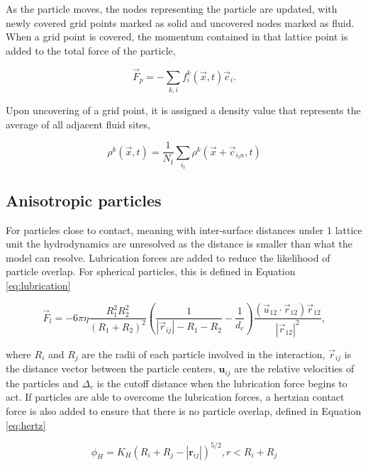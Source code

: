 As the particle moves, the nodes representing the particle are updated, with newly covered grid points marked as solid and 
uncovered nodes marked as fluid. When a grid point is covered, the momentum contained in that lattice point is added to the 
total force of the particle,

\begin{equation}
    \vec{F}_p = -\sum_{k,i} f_i^k(\vec{x},t)\vec{c}_i .
\end{equation}

Upon uncovering of a grid point, it is assigned a density value that represents the average of all adjacent fluid sites,

\begin{equation}
    \rho^k(\vec{x},t) = \frac{1}{N_{\text{f}}} \sum_{i_{\text{f}}} \rho^k(\vec{x}+\vec{c}_{i_{\text{f}}n}, t)
    \label{eq:fill_particles}
\end{equation}

\subsection{Anisotropic particles}
\label{section:lbm_colloids_ellipsoids}

For particles close to contact, meaning with inter-surface distances under 1 lattice unit the hydrodynamics are unresolved as the
distance is smaller than what the model can resolve. Lubrication forces are added to reduce the likelihood of particle overlap. For 
spherical particles, this is defined in Equation \eqref{eq:lubrication}

\begin{equation}
    \vec{F}_l = -6 \pi \eta \frac{R_1^2 R_2^2}{\left(R_1+R_2\right)^2}\left(\frac{1}{|\vec{r}_{ij}|-R_1-R_2}-\frac{1}{d_c}\right) \frac{\left(\vec{u}_{12}\cdot\vec{r}_{12}\right)\vec{r}_{12}}{|\vec{r}_{12}|^2} ,%
    \label{eq:lubrication}
\end{equation}

where $R_i$ and $R_j$ are the radii of each particle involved in the interaction, $\vec{r}_{ij}$ is the distance
vector between the particle centers, $\mathbf{u}_{ij}$ are the relative velocities of the particles and $\Delta_c$ 
is the cutoff distance when the lubrication force begins to act. If particles are able to overcome the lubrication forces, 
a hertzian contact force is also added to ensure that there is no particle overlap, defined in Equation \eqref{eq:hertz}

\begin{equation}
    \phi_{H} = K_{H}(R_i + R_j - |\mathbf{r}_{ij}|)^{5/2}, r < R_i + R_j
    \label{eq:hertz}
\end{equation}

